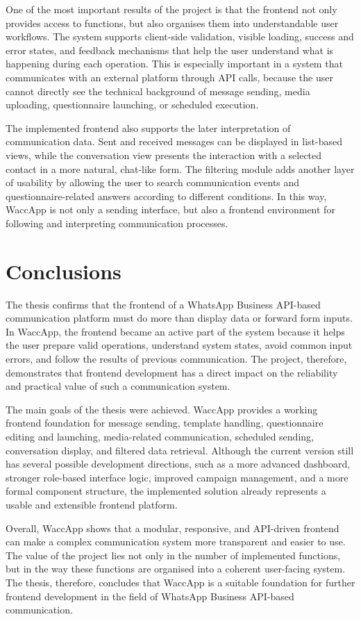 One of the most important results of the project is that the frontend not only provides access to functions, but also organises them into understandable user workflows. The system supports client-side validation, visible loading, success and error states, and feedback mechanisms that help the user understand what is happening during each operation. This is especially important in a system that communicates with an external platform through API calls, because the user cannot directly see the technical background of message sending, media uploading, questionnaire launching, or scheduled execution. 

The implemented frontend also supports the later interpretation of communication data. Sent and received messages can be displayed in list-based views, while the conversation view presents the interaction with a selected contact in a more natural, chat-like form. The filtering module adds another layer of usability by allowing the user to search communication events and questionnaire-related answers according to different conditions. In this way, WaccApp is not only a sending interface, but also a frontend environment for following and interpreting communication processes. 

\section{Conclusions}

The thesis confirms that the frontend of a WhatsApp Business API-based communication platform must do more than display data or forward form inputs. In WaccApp, the frontend became an active part of the system because it helps the user prepare valid operations, understand system states, avoid common input errors, and follow the results of previous communication. The project, therefore, demonstrates that frontend development has a direct impact on the reliability and practical value of such a communication system. 

The main goals of the thesis were achieved. WaccApp provides a working frontend foundation for message sending, template handling, questionnaire editing and launching, media-related communication, scheduled sending, conversation display, and filtered data retrieval. Although the current version still has several possible development directions, such as a more advanced dashboard, stronger role-based interface logic, improved campaign management, and a more formal component structure, the implemented solution already represents a usable and extensible frontend platform. 

Overall, WaccApp shows that a modular, responsive, and API-driven frontend can make a complex communication system more transparent and easier to use. The value of the project lies not only in the number of implemented functions, but in the way these functions are organised into a coherent user-facing system. The thesis, therefore, concludes that WaccApp is a suitable foundation for further frontend development in the field of WhatsApp Business API-based communication. 

